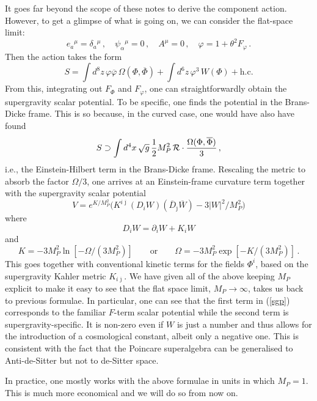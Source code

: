 \documentclass[12pt]{article}
\newcommand{\be}{\begin{equation}}
\newcommand{\ee}{\end{equation}}
\newcommand{\ol}{\overline}
\numberwithin{equation}{section}
\begin{document}
It goes far beyond the scope of these notes to derive the component action. However, to get a glimpse of what is going on, we can consider the flat-space limit:
\be
e_a{}^\mu=\delta_a{}^\mu\,,\quad \psi_\alpha{}^\mu=0\,,\quad A^\mu=0\,,\quad
\varphi=1+\theta^2F_\varphi\,.
\ee
Then the action takes the form
\be
S=\int d^8z\,\varphi\ol{\varphi}\, \Omega(\Phi,\ol{\Phi})+\int d^6 z\, \varphi^3\, W(\Phi)+ \mbox{h.c.}\label{ssa}
\ee
From this, integrating out $F_\Phi$ and $F_\varphi$, one can straightforwardly obtain the supergravity scalar potential. To be specific, one finds the potential in the Brans-Dicke frame. This is so because, in the curved case, one would have also have found
\be
S \supset \int d^4x\,\sqrt{g}\,\frac{1}{2}M_P^2\,{\cal R}\cdot\frac{\Omega(\Phi,\ol{\Phi})}{3}\,,
\ee
i.e., the Einstein-Hilbert term in the Brans-Dicke frame. Rescaling the metric to absorb the factor $\Omega/3$, one arrives at an Einstein-frame curvature term together with the supergravity scalar potential
\be
V=e^{K/M_P^2}\Big(K^{i\ol{\jmath}}(D_iW)(\ol{D}_{\ol{\jmath}}\ol{W})-3|W|^2 /M_P^2 \Big)\label{sgp}
\ee
where
\be
D_iW=\partial_iW+K_iW
\ee
and
\be
K=-3M_P^2\ln[-\Omega/(3M_P^2)]\qquad \mbox{or}\qquad \Omega=-3M_P^2\exp[-K/(3M_P^2)]\,.
\ee
This goes together with conventional kinetic terms for the fields $\Phi^i$, based on the supergravity Kahler metric $K_{i\ol{\jmath}}$. We have given all of the above keeping $M_P$ explicit to make it easy to see that the flat space limit, $M_P\to \infty$, takes us back to previous formulae. In particular, one can see that the first term in (\ref{sgp}) corresponds to the familiar $F$-term scalar potential while the second term is supergravity-specific. It is non-zero even if $W$ is just a number and thus allows for the introduction of a cosmological constant, albeit only a negative one. This is consistent with the fact that the Poincare superalgebra can be generalised to Anti-de-Sitter but not to de-Sitter space.

In practice, one mostly works with the above formulae in units in which $M_P=1$. This is much more economical and we will do so from now on.
\end{document}

